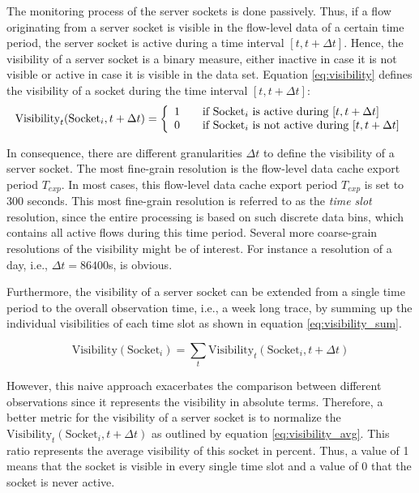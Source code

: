 The monitoring process of the \glspl{server socket} is done passively. 
Thus, if a flow originating from a \gls{server socket} is visible in the flow-level data of a certain time period, the \gls{server socket} is active during a time interval $[t,t+\Delta{t}]$. 
Hence, the visibility of a \gls{server socket} is a binary measure, either inactive in case it is not visible or active in case it is visible in the data set. 
Equation \ref{eq:visibility} defines the visibility of a socket during the time interval $[t,t+\Delta{t}]$:
\begin{equation}
	\text{Visibility}_t(\text{Socket}_i,t+\Delta{t}) = \left\{
	\begin{array}{l l}
		1 & \quad \text{if $\text{Socket}_i$ is active during $[t,t+\Delta{t}]$}\\
		0 & \quad \text{if $\text{Socket}_i$ is not active during $[t,t+\Delta{t}]$}\\
	\end{array}
	\right.
	\label{eq:visibility}
\end{equation}

In consequence, there are different granularities $\Delta{t}$ to define the visibility of a \gls{server socket}. 
The most fine-grain resolution is the flow-level data cache export period $T_{exp}$. 
In most cases, this flow-level data cache export period $T_{exp}$ is set to 300 seconds. 
This most fine-grain resolution is referred to as the \emph{time slot} resolution, since the entire processing is based on such discrete data bins, which contains all active flows during this time period. 
Several more coarse-grain resolutions of the visibility might be of interest. For instance a resolution of a day, i.e., $\Delta{t} = 86400$s, is obvious.

Furthermore, the visibility of a \gls{server socket} can be extended from a single time period to the overall observation time, i.e., a week long trace, by summing up the individual visibilities of each time slot as shown in equation \ref{eq:visibility_sum}.

\begin{equation}
	\text{Visibility}(\text{Socket}_i) = \sum_{t} \text{Visibility}_t(\text{Socket}_i,t+\Delta{t})
	\label{eq:visibility_sum}
\end{equation}

However, this naive approach exacerbates the comparison between different observations since it represents the visibility in absolute terms. 
Therefore, a better metric for the visibility of a \gls{server socket} is to normalize the $\text{Visibility}_t(\text{Socket}_i,t+\Delta{t})$ as outlined by equation \ref{eq:visibility_avg}.
This ratio represents the average visibility of this socket in percent.
Thus, a value of 1 means that the socket is visible in every single time slot and a value of 0 that the socket is never active.

